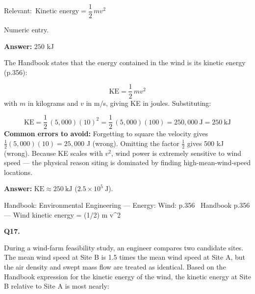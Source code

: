 \documentclass[11pt]{article}
\begin{document}
{\small\color{soft}Relevant:}\ $\text{Kinetic energy} = \dfrac{1}{2}\,m v^2$\par\vspace{3pt}
{\small\color{soft}Numeric entry.}\par\vspace{3pt}
\vspace{2pt}\par\noindent\colorbox{boxbg}{\parbox{\dimexpr\linewidth-2\fboxsep\relax}{%
\vspace{2pt}\textbf{Answer:} $250$ kJ\par\vspace{2pt}
{\small The Handbook states that the energy contained in the wind is its kinetic energy (p.356):\par
\[\text{KE} = \frac{1}{2}\,m v^2\]
with $m$ in kilograms and $v$ in m/s, giving KE in joules. Substituting:\par
\[\text{KE} = \frac{1}{2}\,(5{,}000)(10)^2 = \frac{1}{2}\,(5{,}000)(100) = 250{,}000\ \text{J} = 250\ \text{kJ}\]
\textbf{Common errors to avoid:} Forgetting to square the velocity gives $\frac{1}{2}(5{,}000)(10) = 25{,}000$ J (wrong). Omitting the factor $\frac{1}{2}$ gives 500 kJ (wrong). Because KE scales with $v^2$, wind power is extremely sensitive to wind speed --- the physical reason siting is dominated by finding high-mean-wind-speed locations.\par
\textbf{Answer:} $\text{KE} \approx 250\ \text{kJ}$ ($2.5 \times 10^5\ \text{J}$).\par}\par\vspace{2pt}
{\footnotesize\color{soft}Handbook: Environmental Engineering --- Energy: Wind: p.356 \textbullet\ Handbook p.356 --- Wind kinetic energy = (1/2) m v\textasciicircum{}2}\vspace{2pt}
}}
\vspace{9pt}
\filbreak
\textbf{\color{accent}Q17.}\par\vspace{2pt}
During a wind-farm feasibility study, an engineer compares two candidate sites. The mean wind speed at Site B is 1.5 times the mean wind speed at Site A, but the air density and swept mass flow are treated as identical. Based on the Handbook expression for the kinetic energy of the wind, the kinetic energy at Site B relative to Site A is most nearly:\par\par\vspace{3pt}
\end{document}
